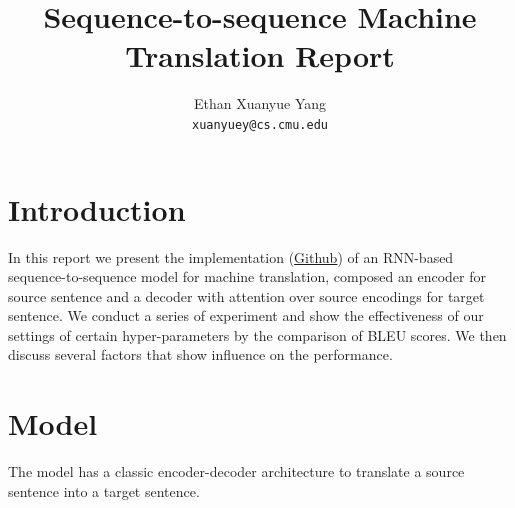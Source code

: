 \documentclass[11pt,a4paper]{article}
\title{Sequence-to-sequence Machine Translation Report}
\author{Ethan Xuanyue Yang \\
  {\tt xuanyuey@cs.cmu.edu}}
\begin{document}
\maketitle

\section{Introduction}

In this report we present the implementation (\href{https://github.com/YangXuanyue/mt-hw1-encoder-decoder}{Github}) of an RNN-based sequence-to-sequence model for machine translation, composed an encoder for source sentence and a decoder with attention over source encodings for target sentence. We conduct a series of experiment and show the effectiveness of our settings of certain hyper-parameters by the comparison of BLEU scores. We then discuss several factors that show influence on the performance.

\section{Model}
The model has a classic encoder-decoder architecture to translate a source sentence into a target sentence.
\end{document}

